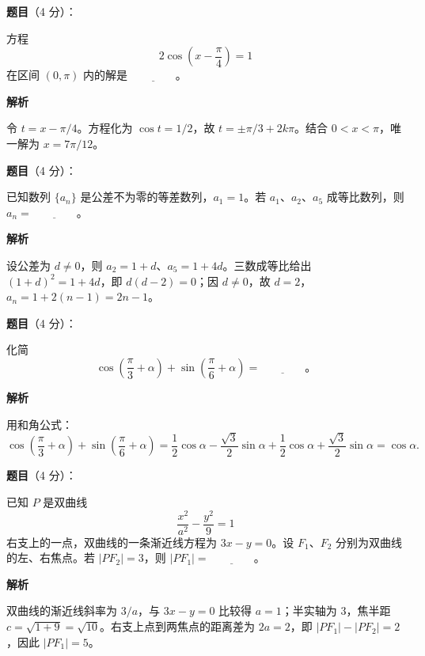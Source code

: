 \begin{answer}

\textbf{题目}（4 分）：

方程
\nopagebreak[4]
\[
2\cos\left(x-\frac\pi4\right)=1
\]
在区间 \((0,\pi)\) 内的解是 \(\underline{\qquad\qquad}\)。

\textbf{解析}

令 $t=x-\pi/4$。方程化为 $\cos t=1/2$，故 $t=\pm\pi/3+2k\pi$。结合 $0<x<\pi$，唯一解为 $x=7\pi/12$。


\end{answer}
\begin{answer}

\textbf{题目}（4 分）：

已知数列 \(\{a_n\}\) 是公差不为零的等差数列，\(a_1=1\)。若 \(a_1\text{、}a_2\text{、}a_5\) 成等比数列，则 \(a_n=\underline{\qquad\qquad}\)。

\textbf{解析}

设公差为 $d\ne0$，则 $a_2=1+d$、$a_5=1+4d$。三数成等比给出 $(1+d)^2=1+4d$，即 $d(d-2)=0$；因 $d\ne0$，故 $d=2$，$a_n=1+2(n-1)=2n-1$。


\end{answer}
\begin{answer}

\textbf{题目}（4 分）：

化简
\nopagebreak[4]
\[
\cos\left(\frac\pi3+\alpha\right)+\sin\left(\frac\pi6+\alpha\right)=\underline{\qquad\qquad}\text{。}
\]

\textbf{解析}

用和角公式：
\nopagebreak[4]
\[
\cos\left(\frac\pi3+\alpha\right)+\sin\left(\frac\pi6+\alpha\right)
=\frac12\cos\alpha-\frac{\sqrt3}{2}\sin\alpha
+\frac12\cos\alpha+\frac{\sqrt3}{2}\sin\alpha=\cos\alpha.
\]


\end{answer}
\begin{answer}

\textbf{题目}（4 分）：

已知 \(P\) 是双曲线
\nopagebreak[4]
\[
\frac{x^2}{a^2}-\frac{y^2}{9}=1
\]
右支上的一点，双曲线的一条渐近线方程为 \(3x-y=0\)。设 \(F_1\text{、}F_2\) 分别为双曲线的左、右焦点。若 \(|PF_2|=3\)，则 \(|PF_1|=\underline{\qquad\qquad}\)。

\textbf{解析}

双曲线的渐近线斜率为 $3/ a$，与 $3x-y=0$ 比较得 $a=1$；半实轴为 $3$，焦半距 $c=\sqrt{1+9}=\sqrt{10}$。右支上点到两焦点的距离差为 $2a=2$，即 $|PF_1|-|PF_2|=2$，因此 $|PF_1|=5$。


\end{answer}
